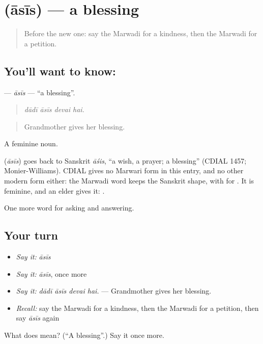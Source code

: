 \section[\texorpdfstring{\mw{आसीस} (āsīs)}{आसीस (āsīs)}]{ (āsīs) — a blessing}

\label{lesson:MW-C266-asis}



\begin{quote}
Before the new one: say the Marwadi for a kindness, then the Marwadi for a petition.
\end{quote}

\subsection*{You'll want to know: }
\textbf{} — \emph{āsīs} — \textquotedblleft{}a blessing\textquotedblright{}.

\begin{quote}
   
\end{quote}

\begin{quote}
\emph{dādī āsīs devai hai.}
\end{quote}

\begin{quote}
Grandmother gives her blessing.
\end{quote}

A feminine noun.

\begin{cousinweb}
\textbf{} (\emph{āsīs}) goes back to Sanskrit \emph{āśis}, \textquotedblleft{}a wish, a prayer; a blessing\textquotedblright{} (CDIAL 1457; Monier-Williams). CDIAL gives no Marwari form in this entry, and no other modern form either: the Marwadi word keeps the Sanskrit shape, with  for . It is feminine, and an elder gives it: \textbf{  }.
\end{cousinweb}

\begin{grammarlens}[title={What you've built}]
One more word for asking and answering.
\end{grammarlens}

\subsection*{Your turn}
\begin{itemize}
\raggedright
  \item \emph{Say it:} \emph{āsīs}
  \item \emph{Say it:} \emph{āsīs}, once more
  \item \emph{Say it:} \emph{dādī āsīs devai hai.} — Grandmother gives her blessing.
  \item \emph{Recall:} say the Marwadi for a kindness, then the Marwadi for a petition, then say \emph{āsīs} again
\end{itemize}

\begin{tcolorbox}[breakable,colback=teal!4,colframe=teal!35!black,title={Before you move on}]
What does  mean? (\textquotedblleft{}A blessing\textquotedblright{}.) Say it once more.
\end{tcolorbox}
